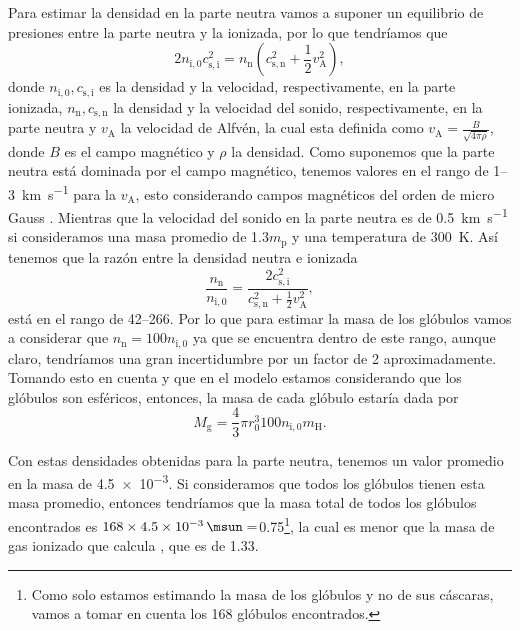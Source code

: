 \documentclass{book}
\begin{document}
Para estimar la densidad en la parte neutra vamos a suponer un equilibrio de presiones entre la parte neutra y la ionizada, por lo que tendríamos que
\begin{equation}
    2 n_\mathrm{i,0}c_\mathrm{s,i}^2 = n_\mathrm{n}(c_\mathrm{s,n}^2+\frac{1}{2}v_\mathrm{A}^2),
\end{equation}
donde $n_\mathrm{i,0}, c_\mathrm{s,i}$ es la densidad y la velocidad, respectivamente, en la parte ionizada, $n_\mathrm{n}, c_\mathrm{s,n}$ la densidad y la velocidad del sonido, respectivamente, en la parte neutra y $v_\mathrm{A}$ la velocidad de Alfvén, la cual esta definida como $v_\mathrm{A}=\frac{B}{\sqrt{4\pi \rho}}$,  donde $B$ es el campo magnético y $\rho$ la densidad. Como suponemos que la parte neutra está dominada por el campo magnético, tenemos valores en el rango de 1--\SI{3}{km.s^{-1}} para la $v_\mathrm{A}$, esto considerando campos magnéticos del orden de micro Gauss \citep{Bertoldi_1989}. Mientras que la velocidad del sonido en la parte neutra es de \SI{0.5}{km.s^{-1}} si consideramos una masa promedio de 1.3$m_\mathrm{p}$ y una temperatura de \SI{300}{K}. Así tenemos que la razón entre la densidad neutra e ionizada 
\begin{equation}
    \frac{n_\mathrm{n}}{n_\mathrm{i,0}}=\frac{2c_\mathrm{s,i}^2}{c_\mathrm{s,n}^2+\frac{1}{2}v_\mathrm{A}^2},
\end{equation}
está en el rango de 42--266. Por lo que para estimar la masa de los glóbulos vamos a considerar que $n_\mathrm{n}=100n_\mathrm{i,0}$ ya que se encuentra dentro de este rango, aunque claro, tendríamos una gran incertidumbre por un factor de 2 aproximadamente. Tomando esto en cuenta y que en el modelo estamos considerando que los glóbulos son esféricos, entonces, la masa de cada glóbulo estaría dada por
\begin{equation}
    M_\mathrm{g} = \frac{4}{3}\pi r_0^3 100n_\mathrm{i,0} m_\mathrm{H}.
\end{equation}

Con estas densidades obtenidas para la parte neutra, tenemos un valor promedio en la masa de \SI{4.5e-3}{\msun}.
Si consideramos que todos los glóbulos tienen esta masa promedio, entonces tendríamos que la masa total de todos los glóbulos encontrados es $168\times\SI{4.5e-3}{\msun}=$\SI{0.75}{\msun}\footnote{Como solo estamos estimando la masa de los glóbulos y no de sus cáscaras, vamos a tomar en cuenta los 168 glóbulos encontrados. }, la cual es menor que la masa de gas ionizado que calcula \cite{Grosdidier:1998}, que es de \SI{1.33}{\msun}.
\end{document}
